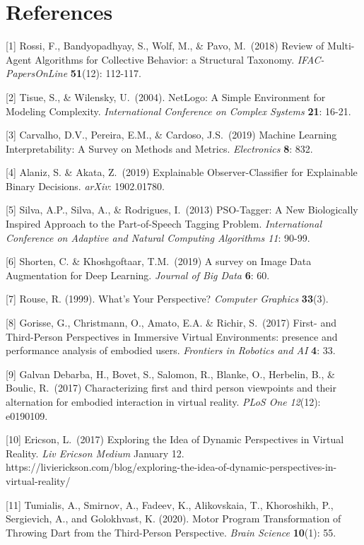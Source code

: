 \documentclass{article}
\begin{document}
\section*{References}
\medskip
\small

[1] Rossi, F., Bandyopadhyay, S., Wolf, M., & Pavo, M.\ (2018) Review of Multi-Agent Algorithms for Collective Behavior: a Structural Taxonomy. {\it IFAC-PapersOnLine} {\bf 51}(12): 112-117.

[2] Tisue, S., & Wilensky, U.\ (2004). NetLogo: A Simple Environment for Modeling Complexity. {\it International Conference on Complex Systems} {\bf 21}: 16-21.

[3] Carvalho, D.V., Pereira, E.M., & Cardoso, J.S.\ (2019) Machine Learning Interpretability: A Survey on Methods and Metrics. {\it Electronics} {\bf 8}: 832.

[4] Alaniz, S. & Akata, Z.\ (2019) Explainable Observer-Classifier for Explainable Binary Decisions. {\it arXiv}: 1902.01780.

[5] Silva, A.P., Silva, A., & Rodrigues, I.\ (2013) PSO-Tagger: A New Biologically Inspired Approach to the Part-of-Speech Tagging Problem. {\it International Conference on Adaptive and Natural Computing Algorithms 11}:  90-99.

[6] Shorten, C. & Khoshgoftaar, T.M.\ (2019) A survey on Image Data Augmentation for Deep Learning. {\it Journal of Big Data} {\bf 6}: 60.

[7] Rouse, R. (1999). What's Your Perspective? {\it Computer Graphics} {\bf 33}(3). 

[8] Gorisse, G., Christmann, O., Amato, E.A. & Richir, S.\ (2017) First- and Third-Person Perspectives in Immersive Virtual Environments: presence and performance analysis of embodied users. {\it Frontiers in Robotics and AI} {\bf 4}: 33.

[9] Galvan Debarba, H., Bovet, S., Salomon, R., Blanke, O., Herbelin, B., & Boulic, R.\ (2017) Characterizing first and third person viewpoints and their alternation for embodied interaction in virtual reality. {\it PLoS One} {\it 12}(12): e0190109. 

[10] Ericson, L.\ (2017) Exploring the Idea of Dynamic Perspectives in Virtual Reality. {\it Liv Ericson Medium} January 12. https://livierickson.com/blog/exploring-the-idea-of-dynamic-perspectives-in- virtual-reality/

[11] Tumialis, A., Smirnov, A., Fadeev, K., Alikovskaia, T., Khoroshikh, P., Sergievich, A., and Golokhvast, K. (2020). Motor Program Transformation of Throwing Dart from the Third-Person Perspective. {\it Brain Science} {\bf 10}(1): 55.
\end{document}

